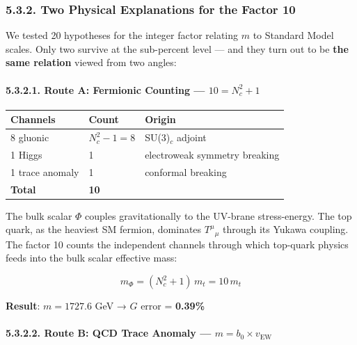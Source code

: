 \documentclass[
  11pt,
]{article}
\begin{document}
\hypertarget{two-physical-explanations-for-the-factor-10}{%
\subsubsection{5.3.2. Two Physical Explanations for the Factor
10}\label{two-physical-explanations-for-the-factor-10}}

We tested 20 hypotheses for the integer factor relating \(m\) to
Standard Model scales. Only two survive at the sub-percent level --- and
they turn out to be \textbf{the same relation} viewed from two angles:

\hypertarget{route-a-fermionic-counting-10-n_c2-1}{%
\paragraph{\texorpdfstring{5.3.2.1. Route A: Fermionic Counting ---
\(10 = N_c^2 + 1\)}{5.3.2.1. Route A: Fermionic Counting --- 10 = N\_c\^{}2 + 1}}\label{route-a-fermionic-counting-10-n_c2-1}}

\begin{longtable}[]{@{}lll@{}}
\toprule
Channels & Count & Origin\tabularnewline
\midrule
\endhead
8 gluonic & \(N_c^2 - 1 = 8\) & SU(3)\(_c\) adjoint\tabularnewline
1 Higgs & 1 & electroweak symmetry breaking\tabularnewline
1 trace anomaly & 1 & conformal breaking\tabularnewline
\textbf{Total} & \textbf{10} &\tabularnewline
\bottomrule
\end{longtable}

The bulk scalar \(\Phi\) couples gravitationally to the UV-brane
stress-energy. The top quark, as the heaviest SM fermion, dominates
\(T^\mu{}_\mu\) through its Yukawa coupling. The factor 10 counts the
independent channels through which top-quark physics feeds into the bulk
scalar effective mass:

\[m_\Phi = (N_c^2 + 1)\,m_t = 10\,m_t \tag{221}\]

\textbf{Result}: \(m = 1727.6\) GeV → \(G\) error = \textbf{0.39\%}

\hypertarget{route-b-qcd-trace-anomaly-m-b_0-times-v_textew}{%
\paragraph{\texorpdfstring{5.3.2.2. Route B: QCD Trace Anomaly ---
\(m = b_0 \times v_{\text{EW}}\)}{5.3.2.2. Route B: QCD Trace Anomaly --- m = b\_0 \textbackslash times v\_\{\textbackslash text\{EW\}\}}}\label{route-b-qcd-trace-anomaly-m-b_0-times-v_textew}}
\end{document}
